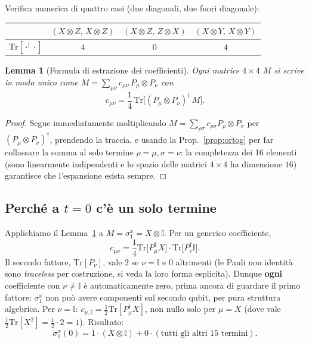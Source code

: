 \documentclass[11pt,a4paper]{article}
\newtheorem{lemma}{Lemma}
\begin{document}
\noindent
Verifica numerica di quattro casi (due diagonali, due fuori diagonale):
\begin{center}
\begin{tabular}{lccc}
\toprule
& $(X{\otimes}Z,\,X{\otimes}Z)$ & $(X{\otimes}Z,\,Z{\otimes}X)$ & $(X{\otimes}Y,\,X{\otimes}Y)$\\
\midrule
$\mathrm{Tr}[\cdot^\dagger\cdot]$ & $4$ & $0$ & $4$\\
\bottomrule
\end{tabular}
\end{center}

\begin{lemma}[Formula di estrazione dei coefficienti]
\label{lem:estrazione}
Ogni matrice $4\times4$ $M$ si scrive in modo unico come
$M=\sum_{\mu\nu}c_{\mu\nu}\,P_\mu\otimes P_\nu$ con
\begin{equation}
c_{\mu\nu}=\frac14\,\mathrm{Tr}\big[(P_\mu\otimes P_\nu)^\dagger\,M\big].
\end{equation}
\end{lemma}
\begin{proof}
Segue immediatamente moltiplicando $M=\sum_{\rho\sigma}c_{\rho\sigma}P_\rho\otimes P_\sigma$ per
$(P_\mu\otimes P_\nu)^\dagger$, prendendo la traccia, e usando la Prop.~\ref{prop:ortog} per
far collassare la somma al solo termine $\rho=\mu,\sigma=\nu$: la completezza dei 16 elementi
(sono linearmente indipendenti e lo spazio delle matrici $4\times4$ ha dimensione $16$) garantisce
che l'espansione esista sempre.
\end{proof}

\subsection{Perché a \texorpdfstring{$t=0$}{t=0} c'è un solo termine}

Applichiamo il Lemma~\ref{lem:estrazione} a $M=\sigma_1^x=X\otimes\mathbb I$. Per un generico
coefficiente,
\begin{equation}
c_{\mu\nu}=\frac14\mathrm{Tr}\big[P_\mu^\dagger X\big]\cdot\mathrm{Tr}\big[P_\nu^\dagger\mathbb I\big].
\end{equation}
Il secondo fattore, $\mathrm{Tr}[P_\nu]$, vale $2$ se $\nu=\mathbb I$ e $0$ altrimenti (le Pauli
non identità sono \emph{traceless} per costruzione, si veda la loro forma esplicita). Dunque
\textbf{ogni} coefficiente con $\nu\neq\mathbb I$ è automaticamente zero, prima ancora di
guardare il primo fattore: $\sigma_1^x$ non può avere componenti sul secondo qubit, per pura
struttura algebrica. Per $\nu=\mathbb I$: $c_{\mu,\mathbb I}=\tfrac12\mathrm{Tr}[P_\mu^\dagger
X]$, non nullo solo per $\mu=X$ (dove vale $\tfrac12\mathrm{Tr}[X^2]=\tfrac12\cdot2=1$). Risultato:
\begin{equation}
\sigma_1^x(0)=1\cdot(X\otimes\mathbb I)+0\cdot(\text{tutti gli altri 15 termini}).
\end{equation}
\end{document}
